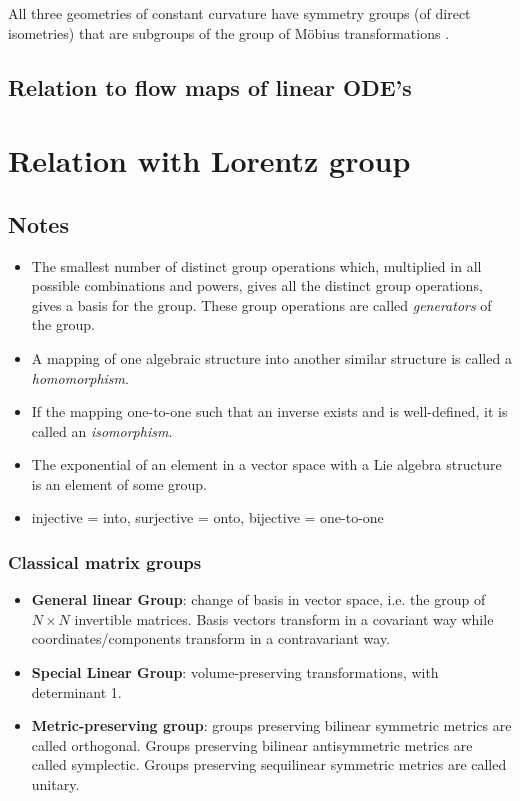 All three geometries of constant curvature have symmetry groups (of direct isometries) that are subgroups of the group of Möbius transformations \cite{Needham2021}.

\subsection{Relation to flow maps of linear ODE's}

\section{Relation with Lorentz group}

\subsection{Notes}
\begin{itemize}
    \item The smallest number of distinct group operations which, multiplied in all possible combinations and powers, gives all the distinct group operations, gives a basis for the group. These group operations are called \emph{generators} of the group.
    \item A mapping of one algebraic structure into another similar structure is called a \emph{homomorphism}.
    \item If the mapping one-to-one such that an inverse exists and is well-defined, it is called an \emph{isomorphism}.
    \item The exponential of an element in a vector space with a Lie algebra structure is an element of some group.
    \item injective = into, surjective = onto, bijective = one-to-one
\end{itemize}

\subsubsection*{Classical matrix groups}
\begin{itemize}
    \item \textbf{General linear Group}: change of basis in vector space, i.e. the group of \(N\times N\) invertible matrices. Basis vectors transform in a covariant way while coordinates/components transform in a contravariant way. 
    \item \textbf{Special Linear Group}: volume-preserving transformations, with determinant 1.
    \item \textbf{Metric-preserving group}: groups preserving bilinear symmetric metrics are called orthogonal. Groups preserving bilinear antisymmetric metrics are called symplectic. Groups preserving sequilinear symmetric metrics are called unitary.
\end{itemize}


